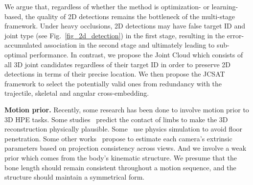 We argue that, regardless of whether the method is optimization- or learning-based, the quality of 2D detections remains the bottleneck of the multi-stage framework.
Under heavy occlusions, 2D detections may have false target ID and joint type (see Fig.~\ref{fig_2d_detection}) in the first stage, resulting in the error-accumulated association in the second stage and ultimately leading to sub-optimal performance. In contrast, we propose the Joint Cloud which consists of all 3D joint candidates regardless of their target ID in order to preserve 2D detections in terms of their precise location. We then propose the JCSAT framework to select the potentially valid ones from redundancy with the trajectile, skeletal and angular cross-embedding. 

\noindent\textbf{Motion prior.} Recently, some research has been done to involve motion prior to 3D HPE tasks. Some studies~\cite{rempe2021humor,huang2022neural} predict the contact of limbs to make the 3D reconstruction physically plausible. Some~\cite{gong2022posetriplet,maeda2022motionaug} use physics simulation to avoid floor penetration. Some other works~\cite{kolotouros2019learning,wandt2022elepose,wandt2021canonpose} propose to estimate each camera's extrinsic parameters based on projection consistency across views. 
And we involve a weak prior which comes from the body's kinematic structure. We presume that the bone length should remain consistent throughout a motion sequence, and the structure should maintain a symmetrical form.

